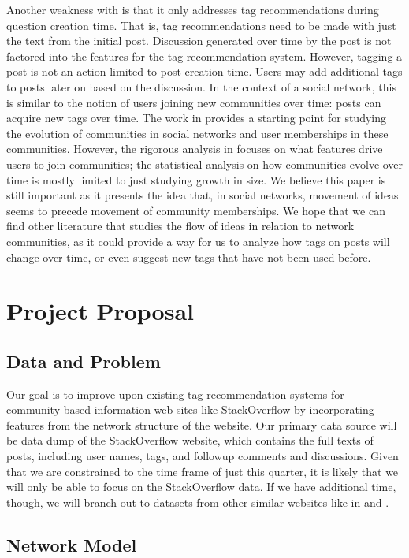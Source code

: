 \documentclass[11pt, final]{article}
\begin{document}
Another weakness with \cite{1} is that it only addresses tag recommendations during question creation time. That is, tag recommendations need to be made with just the text from the initial post. Discussion generated over time by the post is not factored into the features for the tag recommendation system. However, tagging a post is not an action limited to post creation time. Users may add additional tags to posts later on based on the discussion. In the context of a social network, this is similar to the notion of users joining new communities over time: posts can acquire new tags over time. The work in \cite{3} provides a starting point for studying the evolution of communities in social networks and user memberships in these communities. However, the rigorous analysis in \cite{3} focuses on what features drive users to join communities; the statistical analysis on how communities evolve over time is mostly limited to just studying growth in size. We believe this paper is still important as it presents the idea that, in social networks, movement of ideas seems to precede movement of community memberships. We hope that we can find other literature that studies the flow of ideas in relation to network communities, as it could provide a way for us to analyze how tags on posts will change over time, or even suggest new tags that have not been used before.

\section{Project Proposal}

\subsection{Data and Problem}

Our goal is to improve upon existing tag recommendation systems for community-based information web sites like StackOverflow by incorporating features from the network structure of the website. Our primary data source will be data dump of the StackOverflow website, which contains the full texts of posts, including user names, tags, and followup comments and discussions. Given that we are constrained to the time frame of just this quarter, it is likely that we will only be able to focus on the StackOverflow data. If we have additional time, though, we will branch out to datasets from other similar websites like in \cite{1} and \cite{5}.

\subsection{Network Model}
\end{document}

